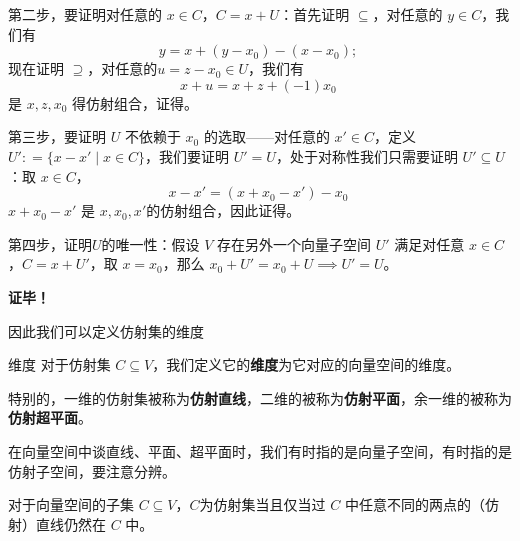 第二步，要证明对任意的 $x \in C$，$C = x + U$：首先证明 $\subseteq$，对任意的 $y \in C$，我们有
\begin{equation}
y = x + (y - x_0) - (x - x_0); ~
\end{equation}
现在证明 $\supseteq$，对任意的$u  = z - x_0 \in U$，我们有
\begin{equation}
x + u = x + z + (-1) x_0 ~
\end{equation}
是 $x, z, x_0$ 得仿射组合，证得。

第三步，要证明 $U$ 不依赖于 $x_0$ 的选取——对任意的 $x' \in C$，定义 $U': = \{x - x' \mid x \in C\}$，我们要证明 $U' = U$，处于对称性我们只需要证明 $U' \subseteq U$：取 $x \in C$，
\begin{equation}
x - x' = (x + x_0 - x') - x_0 ~
\end{equation}
$x + x_0 - x'$ 是 $x, x_0, x'$的仿射组合，因此证得。

第四步，证明$U$的唯一性：假设 $V$ 存在另外一个向量子空间 $U'$ 满足对任意 $x \in C$，$C = x + U'$，取 $x = x_0$，那么 $x_0 + U' = x_0 + U \implies U' = U$。

\textbf{证毕！}

因此我们可以定义仿射集的维度
\begin{definition}{维度}
对于仿射集 $C \subseteq V$，我们定义它的\textbf{维度}为它对应的向量空间的维度。

特别的，一维的仿射集被称为\textbf{仿射直线}，二维的被称为\textbf{仿射平面}，余一维的被称为\textbf{仿射超平面}。
\end{definition}

在向量空间中谈直线、平面、超平面时，我们有时指的是向量子空间，有时指的是仿射子空间，要注意分辨。

\begin{theorem}{}
对于向量空间的子集 $C \subseteq V$，$C$为仿射集当且仅当过 $C$ 中任意不同的两点的（仿射）直线仍然在 $C$ 中。
\end{theorem}
